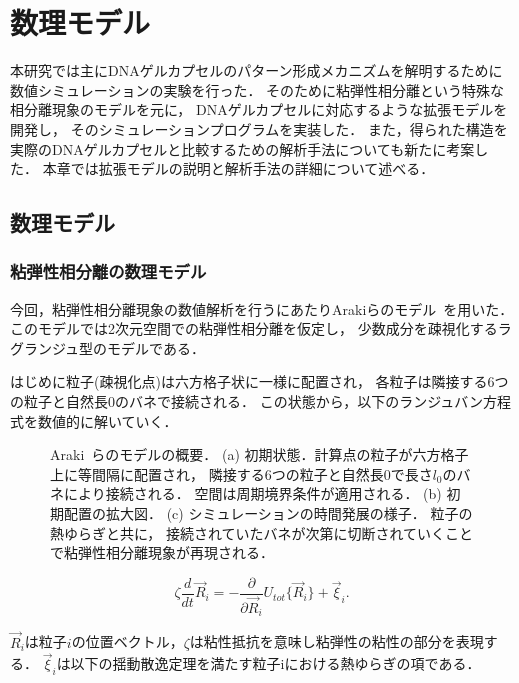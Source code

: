 \chapter{数理モデル}
\label{sec:model}

本研究では主にDNAゲルカプセルのパターン形成メカニズムを解明するために数値シミュレーションの実験を行った．
そのために粘弾性相分離という特殊な相分離現象のモデルを元に，
DNAゲルカプセルに対応するような拡張モデルを開発し，
そのシミュレーションプログラムを実装した．
また，得られた構造を実際のDNAゲルカプセルと比較するための解析手法についても新たに考案した．
本章では拡張モデルの説明と解析手法の詳細について述べる．

\section{数理モデル}

\subsection{粘弾性相分離の数理モデル}
今回，粘弾性相分離現象の数値解析を行うにあたりArakiらのモデル~\cite{araki2005simple}を用いた．
このモデルでは2次元空間での粘弾性相分離を仮定し，
少数成分を疎視化するラグランジュ型のモデルである．

はじめに粒子(疎視化点)は六方格子状に一様に配置され，
各粒子は隣接する6つの粒子と自然長$0$のバネで接続される．
この状態から，以下のランジュバン方程式を数値的に解いていく．


\begin{figure}
\centering

\caption{
    Araki~\cite{araki2005simple}らのモデルの概要．
    (a) 初期状態．計算点の粒子が六方格子上に等間隔に配置され，
        隣接する6つの粒子と自然長$0$で長さ$l_0$のバネにより接続される．
        空間は周期境界条件が適用される．
    (b) 初期配置の拡大図．
    (c) シミュレーションの時間発展の様子．
        粒子の熱ゆらぎと共に，
        接続されていたバネが次第に切断されていくことで粘弾性相分離現象が再現される．
}
\label{fig:model_2d}
\end{figure}


\begin{equation}
\label{eq:main}
\zeta
\frac{d}{dt}
\vec{R}_i
=
-\frac{\partial}{\partial\vec{R}_i}
U_{tot}\{\vec{R}_i\}
+\vec{\xi}_i
.
\end{equation}

$\vec{R}_i$は粒子$i$の位置ベクトル，$\zeta$は粘性抵抗を意味し粘弾性の粘性の部分を表現する．
$\vec{\xi}_i$は以下の揺動散逸定理を満たす粒子iにおける熱ゆらぎの項である．

